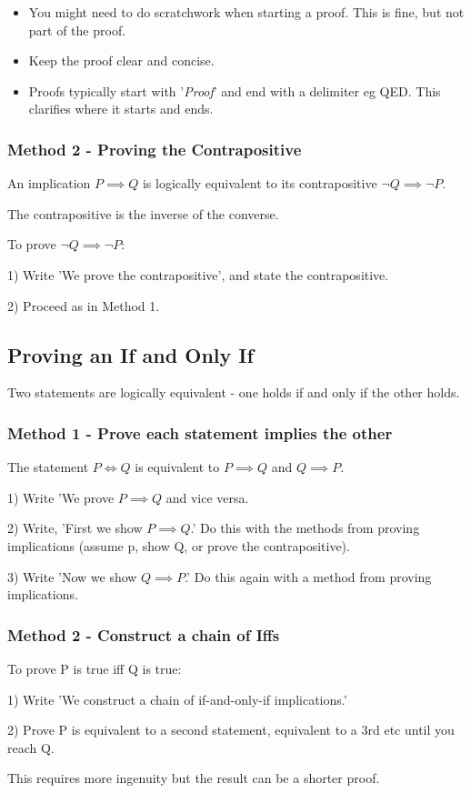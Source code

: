 \begin{itemize}
    \item You might need to do scratchwork when starting a proof. This is fine, but not part of the proof. 
    \item Keep the proof clear and concise.
    \item Proofs typically start with '\emph{Proof}' and end with a delimiter eg QED. This clarifies where it starts and ends.
\end{itemize}

\subsubsection{Method 2 - Proving the Contrapositive}

An implication \(P \implies Q\) is logically equivalent to its contrapositive \( \neg Q \implies \neg P\).

\vspace{1mm}

The contrapositive is the inverse of the converse.

To prove \(\neg Q \implies \neg P\):

1) Write 'We prove the contrapositive', and state the contrapositive.

2) Proceed as in Method 1.

\subsection{Proving an If and Only If}

Two statements are logically equivalent - one holds if and only if the other holds.

\subsubsection{Method 1 - Prove each statement implies the other}

The statement \(P \iff Q\) is equivalent to \(P \implies Q\) and \(Q \implies P\).

1) Write 'We prove \(P \implies Q\) and vice versa.

2) Write, 'First we show \(P \implies Q\).' Do this with the methods from proving implications (assume p, show Q, or prove the contrapositive).

3) Write 'Now we show \(Q \implies P\).' Do this again with a method from proving implications.

\subsubsection{Method 2 - Construct a chain of Iffs}

To prove P is true iff Q is true:

1) Write 'We construct a chain of if-and-only-if implications.'

2) Prove P is equivalent to a second statement, equivalent to a 3rd etc until you reach Q.

\vspace{1mm}

This requires more ingenuity but the result can be a shorter proof.
